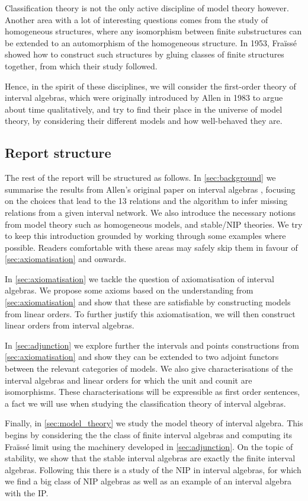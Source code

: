 Classification theory is not the only active discipline of model theory however. Another
area with a lot of interesting questions comes from the study of homogeneous structures,
where any isomorphism between finite substructures can be extended to an automorphism of
the homogeneous structure. In 1953, Fraïssé showed how to construct such structures
by gluing classes of finite structures together, from which their study followed.

Hence, in the spirit of these disciplines, we will consider the first-order theory of
interval algebras, which were originally introduced by Allen in 1983 to argue about time
qualitatively, and try to find their place in the universe of model
theory, by considering their different models and how well-behaved they are.

\subsection{Report structure}%
\label{sub:report_structure}

The rest of the report will be structured as follows. In
\cref{sec:background} we summarise the results from Allen's original paper
on interval algebras \cite{allen83}, focusing on the choices that lead to
the 13 relations and the algorithm to infer missing relations from a given
interval network. We also introduce the necessary notions from model theory
such as homogeneous models, and stable/NIP theories. We try to keep this
introduction grounded by working through some examples where possible.
Readers comfortable with these areas may safely skip them in favour of
\cref{sec:axiomatisation} and onwards.

In \cref{sec:axiomatisation} we tackle the question of axiomatisation of
interval algebras. We propose some axioms based on the understanding from 
\cref{sec:axiomatisation} and show that these are satisfiable by
constructing models from linear orders. To further justify this
axiomatisation, we will then construct linear orders from interval 
algebras.

In \cref{sec:adjunction} we explore further the intervals and points
constructions from \cref{sec:axiomatisation} and show they can be extended to two adjoint
functors between the relevant categories of models. We also give characterisations of
the interval algebras and linear orders for which the unit and counit are isomorphisms.
These characterisations will be expressible as first order sentences, a fact we will use
when studying the classification theory of interval algebras.

Finally, in \cref{sec:model_theory} we study the model theory of interval algebra. This
begins by considering the the class of finite interval algebras and computing its
Fraïssé limit using the machinery developed in \cref{sec:adjunction}. On the topic of
stability, we show that the stable interval algebras are exactly the finite interval
algebras. Following this there is a study of the NIP in interval algebras, for which
we find a big class of NIP algebras as well as an example of an interval algebra with the
IP.


